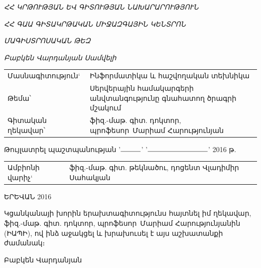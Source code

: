 \documentclass[a4paper,12pt]{article}
\author{\MYAUTHOR}
\title{\MYTITLE}
\date{2016}
\def\MYDIRECTOR{Մարիամ Հարությունյան}
\def\MYDIRECTORTITLE{ֆիզ.-մաթ. գիտ. դոկտոր, պրոֆեսոր}
\def\MYTITLE{Սերվերային համակարգերի անվտանգությունը գնահատող ծրագրի մշակում}
\begin{document}
\begin{titlepage}
	\centering
	{\LARGE
		\textit{ՀՀ ԿՐԹՈՒԹՅԱՆ ԵՎ ԳԻՏՈՒԹՅԱՆ ՆԱԽԱՐԱՐՈՒԹՅՈՒՆ} \par
		\textit{ՀՀ ԳԱԱ ԳԻՏԱԿՐԹԱԿԱՆ ՄԻՋԱԶԳԱՅԻՆ ԿԵՆՏՐՈՆ} \par
		\textit{ՄԱԳԻՍՏՐՈՍԱԿԱՆ ԹԵԶ} \par
		\textit{Բաբկեն Վարդանյան Սամվելի} \par
	}

	\vspace{2.5cm}

	\raggedright
	{\Large
		\begin{tabularx}{\textwidth}{ p{6.5cm} X }
		Մասնագիտություն` & Ինֆորմատիկա և հաշվողական տեխնիկա \\
		Թեմա՝ & \MYTITLE \\
		Գիտական ղեկավար՝ & \MYDIRECTORTITLE \ \MYDIRECTOR \\
		\end{tabularx}
	}

	\vspace{2cm}

	{\Large Թույլատրել պաշտպանության '$\rule{1cm}{0.15mm}$' '$\rule{3cm}{0.15mm}$' 2016 թ. \par}

	\vspace{2cm}
	{\Large
	}
	{\Large
		\begin{tabularx}{\textwidth}{ p{6.5cm} X }
		Ամբիոնի վարիչ` & ֆիզ.-մաթ. գիտ. թեկնածու, դոցենտ Վլադիմիր Սահակյան \\
		\end{tabularx}
	}

	\centering
	\vfill
	{\Large ԵՐԵՎԱՆ 2016\par}
\end{titlepage}
\newpage

\setcounter{page}{2}

Կցանկանայի խորին երախտագիտությունս հայտնել իմ ղեկավար, \MYDIRECTORTITLE \
\MYDIRECTOR ին (ԻԱՊԻ), ով ինձ աջակցել և խրախուսել է այս աշխատանքի
ժամանակ։

\hfill \hfill Բաբկեն Վարդանյան

\newpage

\tableofcontents
\end{document}

